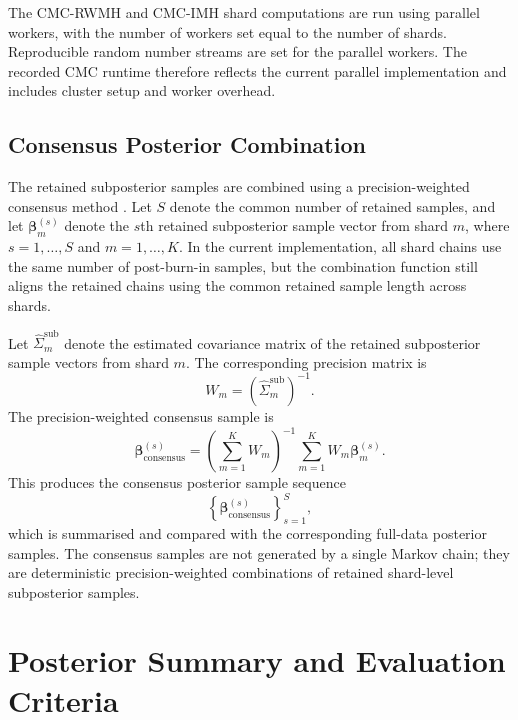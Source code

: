 The CMC-RWMH and CMC-IMH shard computations are run using parallel workers, with the number of workers set equal to the number of shards. Reproducible random number streams are set for the parallel workers. The recorded CMC runtime therefore reflects the current parallel implementation and includes cluster setup and worker overhead.

\subsection{Consensus Posterior Combination}

The retained subposterior samples are combined using a precision-weighted consensus method \cite{scott2017comparing}. Let $S$ denote the common number of retained samples, and let $\boldsymbol{\beta}_m^{(s)}$ denote the $s$th retained subposterior sample vector from shard $m$, where $s=1,\ldots,S$ and $m=1,\ldots,K$. In the current implementation, all shard chains use the same number of post-burn-in samples, but the combination function still aligns the retained chains using the common retained sample length across shards.

Let $\widehat{\Sigma}_m^{\mathrm{sub}}$ denote the estimated covariance matrix of the retained subposterior sample vectors from shard $m$. The corresponding precision matrix is
\[
W_m
=
\left(
\widehat{\Sigma}_m^{\mathrm{sub}}
\right)^{-1}.
\]
The precision-weighted consensus sample is
\[
\boldsymbol{\beta}_{\mathrm{consensus}}^{(s)}
=
\left(
\sum_{m=1}^{K}
W_m
\right)^{-1}
\sum_{m=1}^{K}
W_m
\boldsymbol{\beta}_m^{(s)}.
\]
This produces the consensus posterior sample sequence
\[
\left\{
\boldsymbol{\beta}_{\mathrm{consensus}}^{(s)}
\right\}_{s=1}^{S},
\]
which is summarised and compared with the corresponding full-data posterior samples. The consensus samples are not generated by a single Markov chain; they are deterministic precision-weighted combinations of retained shard-level subposterior samples.

\section{Posterior Summary and Evaluation Criteria}


